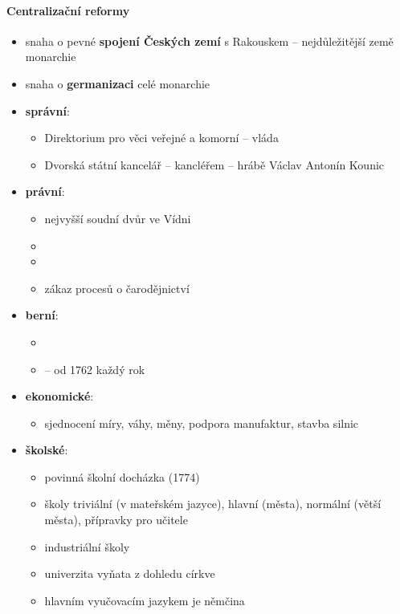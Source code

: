 \paragraph{Centralizační reformy}
\begin{itemize}
\item snaha o pevné \textbf{spojení Českých zemí} s Rakouskem -- nejdůležitější země monarchie
\item snaha o \textbf{germanizaci} celé monarchie
\item \textbf{správní}:
	\begin{itemize}
	\item Direktorium pro věci veřejné a komorní -- vláda
	\item Dvorská státní kancelář -- kancléřem -- hrábě Václav Antonín Kounic
	\end{itemize}
\item \textbf{právní}:
	\begin{itemize}
	\item nejvyšší soudní dvůr ve Vídni
	\item {}
	\item {}
	\item zákaz procesů o čarodějnictví
	\end{itemize}
\item \textbf{berní}:
	\begin{itemize}
	\item {}
	\item {}  -- od 1762 každý rok
	\end{itemize}
\item \textbf{ekonomické}:
	\begin{itemize}
	\item sjednocení míry, váhy, měny, podpora manufaktur, stavba silnic
	\end{itemize}
\item \textbf{školské}:
	\begin{itemize}
	\item povinná školní docházka (1774)
	\item školy triviální (v mateřském jazyce), hlavní (města), normální (větší města), přípravky pro učitele 
	\item industriální školy
	\item univerzita vyňata z dohledu církve
	\item hlavním vyučovacím jazykem je němčina
	\end{itemize}

\end{itemize}
